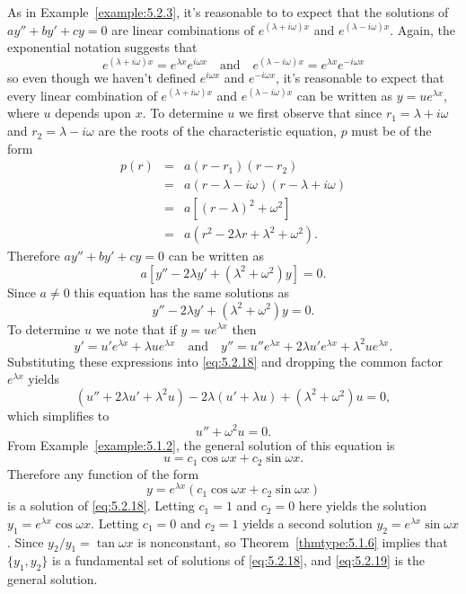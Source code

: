 \documentclass{ximera}
\begin{document}
As in Example~\ref{example:5.2.3}, it's reasonable to
to expect that the solutions of $ay''+by'+cy=0$  are linear
combinations of
$e^{(\lambda+i\omega)x}$ and $e^{(\lambda-i\omega)x}$.
Again,  the exponential notation suggests that
$$
e^{(\lambda+i\omega)x}=e^{\lambda x}e^{i\omega x}\quad\mbox{and}\quad e^{(\lambda-i\omega)x}=e^{\lambda x}e^{-i\omega x}
$$
so even though we haven't defined $e^{i\omega x}$ and
$e^{-i\omega x}$, it's reasonable to expect that every linear
combination of $e^{(\lambda+i\omega)x}$ and $e^{(\lambda-i\omega)x}$
can  be written as
$y=ue^{\lambda x}$, where $u$ depends upon $x$.
To determine $u$ we first observe that since $r_1=\lambda+i\omega$
and $r_2=\lambda-i\omega$ are the roots of the characteristic
equation,  $p$ must be of  the form
$$
\begin{array}{ccl}
p(r)&=&a(r-r_1)(r-r_2)\\
&=&a(r-\lambda-i\omega)(r-\lambda+i\omega)\\
&=& a \left[(r-\lambda)^2+\omega^2\right]\\
&=&a(r^2-2\lambda r +\lambda^2+\omega^2).
\end{array}
$$
Therefore $ay''+by'+cy=0$ can be written as
$$
a\left[y''-2\lambda y'+(\lambda^2+\omega^2)y\right]=0.
$$
 Since $a\neq 0$
this equation has the same solutions as
\begin{equation} \label{eq:5.2.18}
y''-2\lambda y'+(\lambda^2+\omega^2)y=0.
\end{equation}
 To determine $u$ we note
that if $y=ue^{\lambda x}$ then
$$
y'=u'e^{\lambda x}+\lambda ue^{\lambda x}\quad\mbox{and}\quad
y''=u''e^{\lambda x}+2\lambda u'e^{\lambda x}+\lambda^2ue^{\lambda x}.
$$
Substituting these expressions  into
\eqref{eq:5.2.18} and dropping the common factor $e^{\lambda x}$ yields
$$
(u''+2\lambda u'+\lambda^2 u)-2\lambda(u'+\lambda u)
+(\lambda^2+\omega^2)u=0,
$$
which simplifies to
$$
u''+\omega^2 u=0.
$$
From Example~\ref{example:5.1.2}, the  general solution of this
equation is
$$
u=c_1\cos\omega x +c_2\sin\omega x.
$$
 Therefore any function of the form
\begin{equation} \label{eq:5.2.19}
y=e^{\lambda x}(c_1\cos\omega x+c_2\sin\omega x)
\end{equation}
is  a solution of \eqref{eq:5.2.18}.
Letting $c_1=1$ and $c_2=0$ here yields the solution
 $y_1=e^{\lambda x}\cos\omega x$. Letting $c_1=0$ and $c_2=1$
yields a second solution $y_2=e^{\lambda x}\sin\omega x$. Since
$y_2/y_1=\tan\omega x$
is nonconstant, so  Theorem~\ref{thmtype:5.1.6} implies that
$\{y_1,y_2\}$ is
a fundamental set of solutions of \eqref{eq:5.2.18}, and \eqref{eq:5.2.19}
is the general solution.
\end{document}
